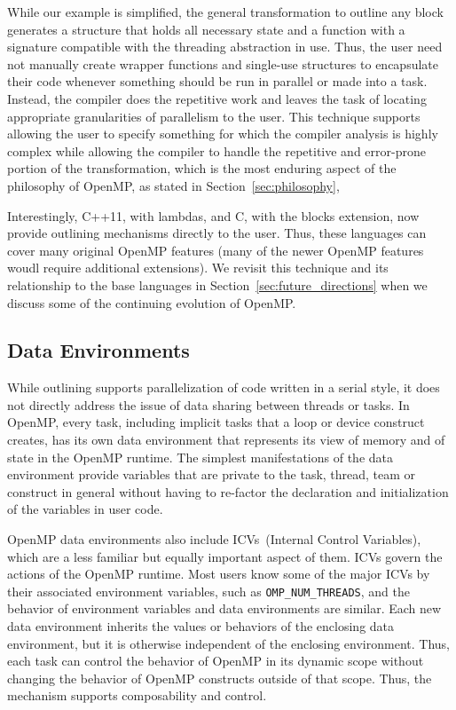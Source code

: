 While our example is simplified, the general transformation to outline any 
block generates a structure that holds all necessary state and a function 
with a signature compatible with the threading abstraction in use. Thus, 
the user need not manually create wrapper functions and single-use structures 
to encapsulate their code whenever something should be run in parallel or 
made into a task. Instead, the compiler does the repetitive work and leaves
the task of locating appropriate granularities of parallelism to the user.
This technique supports allowing the user to specify something for which the
compiler analysis is highly complex while allowing the compiler to handle the
repetitive and error-prone portion of the transformation, which is the most 
enduring aspect of the philosophy of OpenMP, as stated in 
Section~\ref{sec:philosophy}, 

Interestingly, C++11, with lambdas, and C, with the blocks extension, now 
provide outlining mechanisms directly to the user. Thus, these languages
can cover many original OpenMP features (many of the newer OpenMP features
woudl require additional extensions). We revisit this technique and its
relationship to the base languages in Section~\ref{sec:future_directions} 
when we discuss some of the continuing evolution of OpenMP.

\subsection{Data Environments}
\label{sub:data_environments}

While outlining supports parallelization of code written in a serial style, 
it does not directly address the issue of data sharing between threads or 
tasks. In OpenMP, every task, including implicit tasks that a loop or 
device construct creates, has its own data environment that represents its 
view of memory and of state in the OpenMP runtime. The simplest manifestations
of the data environment provide variables that are private to the task, 
thread, team or construct in general without having to re-factor the 
declaration and initialization of the variables in user code.

OpenMP data environments also include ICVs~(Internal Control Variables),
which are a less familiar but equally important aspect of them. ICVs govern
the actions of the OpenMP runtime. Most users know some of the major ICVs by 
their associated environment variables, such as \texttt{OMP\_NUM\_THREADS}, 
and the behavior of environment variables and data environments are similar. 
Each new data environment inherits the values or behaviors of the enclosing 
data environment, but it is otherwise independent of the enclosing environment.
Thus, each task can control the behavior of OpenMP in its dynamic scope 
without changing the behavior of OpenMP constructs outside of that scope.
Thus, the mechanism supports composability and control.

